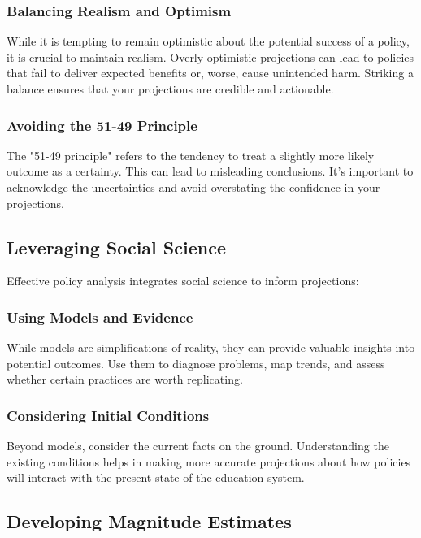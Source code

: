 \documentclass{article}
\theoremstyle{definition}
\theoremstyle{plain}
\begin{document}
\subsubsection{Balancing Realism and Optimism}

While it is tempting to remain optimistic about the potential success of a policy, it is crucial to maintain realism. Overly optimistic projections can lead to policies that fail to deliver expected benefits or, worse, cause unintended harm. Striking a balance ensures that your projections are credible and actionable.

\subsubsection{Avoiding the 51-49 Principle}

The "51-49 principle" refers to the tendency to treat a slightly more likely outcome as a certainty. This can lead to misleading conclusions. It's important to acknowledge the uncertainties and avoid overstating the confidence in your projections.

\subsection{Leveraging Social Science}

Effective policy analysis integrates social science to inform projections:

\subsubsection{Using Models and Evidence}

While models are simplifications of reality, they can provide valuable insights into potential outcomes. Use them to diagnose problems, map trends, and assess whether certain practices are worth replicating.

\subsubsection{Considering Initial Conditions}

Beyond models, consider the current facts on the ground. Understanding the existing conditions helps in making more accurate projections about how policies will interact with the present state of the education system.

\subsection{Developing Magnitude Estimates}
\end{document}
